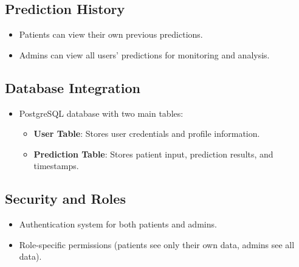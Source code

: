 \subsection*{Prediction History}
\begin{itemize}
    \item Patients can view their own previous predictions.
    \item Admins can view all users' predictions for monitoring and analysis.
\end{itemize}

\subsection*{Database Integration}
\begin{itemize}
    \item PostgreSQL database with two main tables:
    \begin{itemize}
        \item \textbf{User Table}: Stores user credentials and profile information.
        \item \textbf{Prediction Table}: Stores patient input, prediction results, and timestamps.
    \end{itemize}
\end{itemize}

\subsection*{Security and Roles}
\begin{itemize}
    \item Authentication system for both patients and admins.
    \item Role-specific permissions (patients see only their own data, admins see all data).
\end{itemize}


